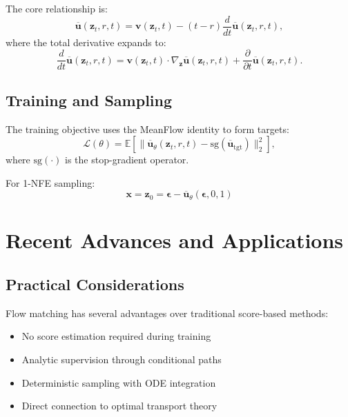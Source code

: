 The core relationship is:
\begin{equation}
    \overline{\mathbf{u}}(\mathbf{z}_t, r, t) = \mathbf{v}(\mathbf{z}_t, t) - (t-r)\frac{d}{dt}\overline{\mathbf{u}}(\mathbf{z}_t, r, t),
\end{equation}
where the total derivative expands to:
\begin{equation}
    \frac{d}{dt}\overline{\mathbf{u}}(\mathbf{z}_t, r, t) = \mathbf{v}(\mathbf{z}_t, t) \cdot \nabla_{\mathbf{z}}\overline{\mathbf{u}}(\mathbf{z}_t, r, t) + \frac{\partial}{\partial t}\overline{\mathbf{u}}(\mathbf{z}_t, r, t).
\end{equation}

\subsection{Training and Sampling}

The training objective uses the MeanFlow identity to form targets:
\begin{equation}
    \mathcal{L}(\theta) = \mathbb{E}\left[\|\overline{\mathbf{u}}_\theta(\mathbf{z}_t, r, t) - \text{sg}(\overline{\mathbf{u}}_{\text{tgt}})\|_2^2\right],
\end{equation}
where $\text{sg}(\cdot)$ is the stop-gradient operator.

For 1-NFE sampling:
\begin{equation}
    \mathbf{x} = \mathbf{z}_0 = \boldsymbol{\epsilon} - \overline{\mathbf{u}}_\theta(\boldsymbol{\epsilon}, 0, 1)
\end{equation}

\section{Recent Advances and Applications}

\subsection{Practical Considerations}

Flow matching has several advantages over traditional score-based methods:
\begin{itemize}
    \item No score estimation required during training
    \item Analytic supervision through conditional paths
    \item Deterministic sampling with ODE integration
    \item Direct connection to optimal transport theory
\end{itemize}

